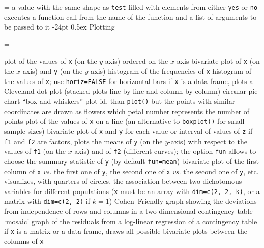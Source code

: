 \documentclass[10pt,landscape]{article}
\makeatletter
\renewcommand\section{\@startsection{section}{1}{0mm}%
                                     {-24pt}%
                                     {0.5ex}%
                                {\color{blue}\normalfont\large\bfseries}}
\newcommand{\code}{\texttt}
\makeatother
\begin{document}
\begin{multicols*}{3}
\everypar={\hangindent=9mm}
 a value with the same shape as \code{test} filled with elements from either \code{yes}	{or \code{no}}
	{executes a function call from the name of the function and a list of arguments to be passed to it}
\section{Plotting}

\everypar={\hangindent=9mm}

  plot of the values of \code{x}	{(on the $y$-axis) ordered on the $x$-axis}
  bivariate plot of \code{x} (on the $x$-axis) and \code{y}	{(on the $y$-axis)}
	{ histogram of the frequencies of \code{x}}
  histogram of the values of \code{x}; use \code{horiz=FALSE}	{for horizontal bars}
  if \code{x}	{is a data frame, plots a Cleveland dot plot (stacked plots line-by-line and column-by-column)}
	{ circular pie-chart}
	{ ``box-and-whiskers'' plot}
  id. than \code{plot()}	{but the points with similar coordinates are drawn as flowers which petal number represents the number of points}
  plot of the values of \code{x} on a line (an alternative to \code{boxplot()}	{for small sample sizes)}
  bivariate plot of \code{x} and \code{y}	{for each value or interval of values of \code{z}}
  if \code{f1} and \code{f2} are factors, plots the means of \code{y} (on the $y$-axis) with respect to the values of \code{f1} (on the $x$-axis) and of \code{f2} (different curves); the option \code{fun} allows to choose the summary statistic of \code{y}	{(by default \code{fun=mean})}
  bivariate plot of the first column of \code{x} {\it vs.} the first one of \code{y}, the second one of \code{x} {\it vs.}	{the second one of \code{y}, etc.}
  visualizes, with quarters of circles, the association between two dichotomous variables for different populations (\code{x} must be an array with \code{dim=c(2, 2, k)}, or a matrix with \code{dim=c(2, 2)}	{if $k=1$)}
	{ Cohen--Friendly graph showing the deviations  from independence of rows and columns in a two dimensional contingency table}
	{ `mosaic' graph of the residuals from a log-linear regression of a contingency table}
  if \code{x}	{is a matrix or a data frame, draws all possible bivariate plots between the columns of \code{x}}

\end{multicols*}
\end{document}
